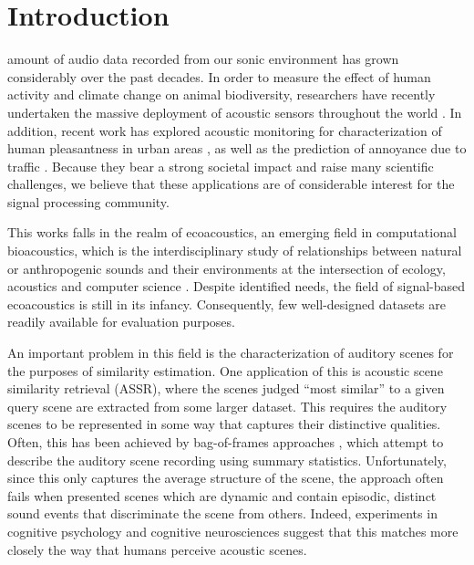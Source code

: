 \documentclass[journal]{IEEEtran}
\begin{document}
%
\IEEEpeerreviewmaketitle

\section{Introduction}

 amount of audio data recorded from our sonic environment has grown considerably over the past decades.
In order to measure the effect of human activity and climate change on animal biodiversity, researchers have recently undertaken the massive deployment of acoustic sensors throughout the world \cite{warren2006urban, NessSST13, stowell13b}. 
In addition, recent work has explored acoustic monitoring for characterization of human pleasantness in urban areas \cite{guyot2005urban, ricciardi2015sound}, as well as the prediction of annoyance due to traffic \cite{gloaguen}.
Because they bear a strong societal impact and raise many scientific challenges, we believe that these applications are of considerable interest for the signal processing community.

This works falls in the realm of ecoacoustics, an emerging field in computational bioacoustics, which is the interdisciplinary study of relationships between natural or anthropogenic sounds and their environments at the intersection of ecology, acoustics and computer science \cite{krause}. Despite identified needs, the field of signal-based ecoacoustics is still in its infancy.
Consequently, few well-designed datasets are readily available for evaluation purposes.

An important problem in this field is the characterization of auditory scenes for the purposes of similarity estimation. One application of this is acoustic scene similarity retrieval (ASSR), where the scenes judged ``most similar'' to a given query scene are extracted from some larger dataset. This requires the auditory scenes to be represented in some way that captures their distinctive qualities. Often, this has been achieved by bag-of-frames approaches \cite{aucouturier2007bag}, which attempt to describe the auditory scene recording using summary statistics. Unfortunately, since this only captures the average structure of the scene, the approach often fails when presented scenes which are dynamic and contain episodic, distinct sound events that discriminate the scene from others. Indeed, experiments in cognitive psychology \cite{dubois2006cognitive} and cognitive neurosciences \cite{nelken2004processing} suggest that this matches more closely the way that humans perceive acoustic scenes. 
\end{document}

